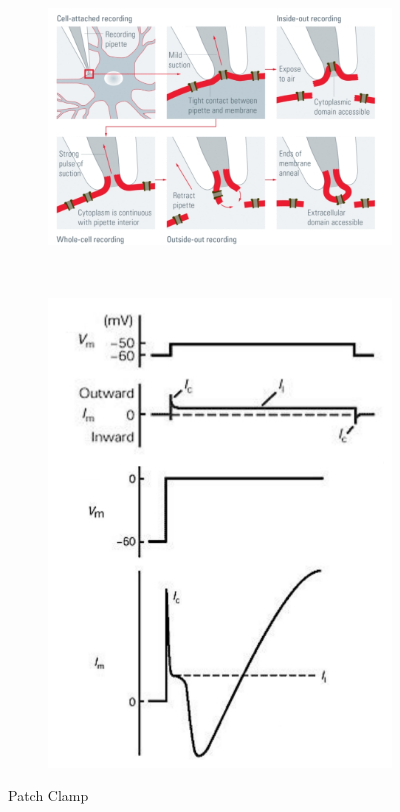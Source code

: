 \documentclass[english,11pt]{article}
\begin{document}
\begin{itemize}
\begin{figure}[H]
        \centering
        \begin{subfigure}[b]{0.65\textwidth}
                \centering
\includegraphics[width=\textwidth]{images/5_2.jpg}
        \end{subfigure}%
        ~
        \begin{subfigure}[b]{0.35\textwidth}
                \centering
\includegraphics[width=\textwidth]{images/5_3.jpg}
        \end{subfigure}
        \caption{Patch Clamp}
\end{figure}



\end{itemize}
\end{document}
